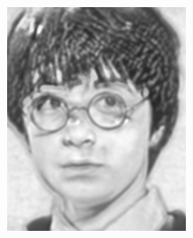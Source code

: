 \documentclass[10pt,twocolumn,letterpaper]{article}
\begin{document}
\begin{figure}[htbp]
{\begin{minipage}[b]{0.22\linewidth}
\includegraphics[width=0.99\linewidth]{img/real_world_photos/bfcn_r4.png}
\end{minipage}
}
\end{figure}
\end{document}
